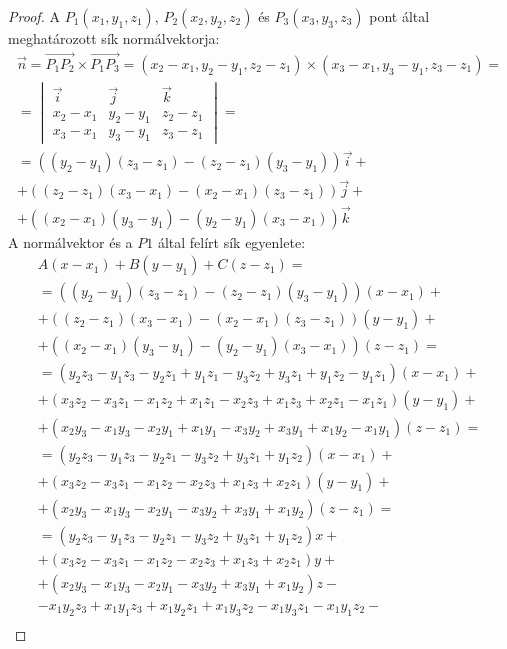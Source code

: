 \begin{proof}
	A $P_1(x_1, y_1, z_1)$, $P_2(x_2, y_2, z_2)$ és $P_3(x_3, y_3, z_3)$ pont által meghatározott sík normálvektorja:
	\[
	\begin{array}{c}
		\vec{n}=\overrightarrow{P_1 P_2}\times\overrightarrow{P_1 P_3}=(x_2-x_1, y_2-y_1, z_2-z_1)\times(x_3-x_1, y_3-y_1, z_3-z_1)=\\
		=
		\begin{vmatrix}
			\vec{i} & \vec{j} & \vec{k} \\
			x_2-x_1 & y_2-y_1 & z_2-z_1 \\
			x_3-x_1 & y_3-y_1 & z_3-z_1
		\end{vmatrix}=\\
		= ((y_2-y_1)(z_3-z_1)-(z_2-z_1)(y_3-y_1))\vec{i}+\\
		+ ((z_2-z_1)(x_3-x_1)-(x_2-x_1)(z_3-z_1))\vec{j}+\\
		+ ((x_2-x_1)(y_3-y_1)-(y_2-y_1)(x_3-x_1))\vec{k}
	\end{array}
	\]
	A normálvektor és a $P1$ által felírt sík egyenlete:
	\[
	\begin{array}{c}
		A(x-x_1)+B(y-y_1)+C(z-z_1)=\\
		=((y_2-y_1)(z_3-z_1)-(z_2-z_1)(y_3-y_1))(x-x_1)+\\
		+((z_2-z_1)(x_3-x_1)-(x_2-x_1)(z_3-z_1))(y-y_1)+\\
		+((x_2-x_1)(y_3-y_1)-(y_2-y_1)(x_3-x_1))(z-z_1)=\\
		=(y_2 z_3 - y_1 z_3 - y_2 z_1 + y_1 z_1 - y_3 z_2 + y_3 z_1 + y_1 z_2 - y_1 z_1)(x-x_1)+\\
		+(x_3 z_2 - x_3 z_1 - x_1 z_2 + x_1 z_1 - x_2 z_3 + x_1 z_3 + x_2 z_1 - x_1 z_1)(y-y_1)+\\
		+(x_2 y_3 - x_1 y_3 - x_2 y_1 + x_1 y_1 - x_3 y_2 + x_3 y_1 + x_1 y_2 - x_1 y_1)(z-z_1)=\\
		=(y_2 z_3 - y_1 z_3 - y_2 z_1 - y_3 z_2 + y_3 z_1 + y_1 z_2)(x-x_1)+\\
		+(x_3 z_2 - x_3 z_1 - x_1 z_2 - x_2 z_3 + x_1 z_3 + x_2 z_1)(y-y_1)+\\
		+(x_2 y_3 - x_1 y_3 - x_2 y_1 - x_3 y_2 + x_3 y_1 + x_1 y_2)(z-z_1)=\\
		=(y_2 z_3 - y_1 z_3 - y_2 z_1 - y_3 z_2 + y_3 z_1 + y_1 z_2)x+\\
		+(x_3 z_2 - x_3 z_1 - x_1 z_2 - x_2 z_3 + x_1 z_3 + x_2 z_1)y+\\
		+(x_2 y_3 - x_1 y_3 - x_2 y_1 - x_3 y_2 + x_3 y_1 + x_1 y_2)z-\\
		- x_1 y_2 z_3 + x_1 y_1 z_3 + x_1 y_2 z_1 + x_1 y_3 z_2 - x_1 y_3 z_1 - x_1 y_1 z_2 -\\

\end{array}\]
\end{proof}
